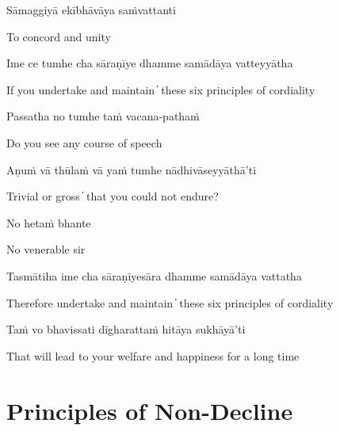Sāmaggiyā ekībhāvāya saṁvattanti

\begin{cprenglish}
  To concord and unity
\end{cprenglish}


Ime ce tumhe cha sāraṇīye dhamme samādāya vatteyyātha

\begin{cprenglish}
  If you undertake and maintain  ̓  these six principles of cordiality
\end{cprenglish}

Passatha no tumhe taṁ vacana-pathaṁ

\begin{cprenglish}
  Do you see any course of speech
\end{cprenglish}

Aṇuṁ vā thūlaṁ vā yaṁ tumhe nādhivāseyyāthā’ti

\begin{cprenglish}
  Trivial or gross  ̓  that you could not endure?
\end{cprenglish}

No hetaṁ bhante

\begin{cprenglish}
  No venerable sir
\end{cprenglish}

Tasmātiha ime cha sāraṇīyesāra dhamme samādāya vattatha

\begin{cprenglish}
  Therefore undertake and maintain  ̓  these six principles of cordiality
\end{cprenglish}

Taṁ vo bhavissati dīgharattaṁ hitāya sukhāyā’ti

\begin{cprenglish}
  That will lead to your welfare and happiness for a long time
\end{cprenglish}


\clearpage

\section{Principles of Non-Decline}

\begin{leader}
\end{leader}

